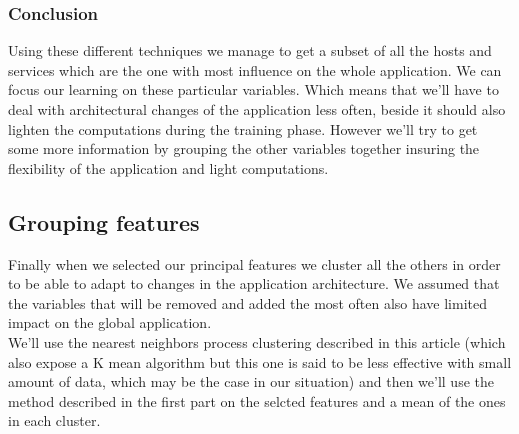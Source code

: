 \documentclass[10pt,a4paper,oneside]{article}
\begin{document}
\begin{multicols}{2}
\subsubsection{Conclusion}
Using these different techniques we manage to get a subset of all the hosts and services which are the one with most influence on the whole application. We can focus our learning on these particular variables. Which means that we'll have to deal with architectural changes of the application less often, beside it should also lighten the computations during the training phase. However we'll try to get some more information by grouping the other variables together insuring the flexibility of the application and light computations.\\
\subsection{Grouping features}
Finally when we selected our principal features we cluster all the others in order to be able to adapt to changes in the application architecture. We assumed that the variables that will be removed and added the most often also have limited impact on the global application.\\
We'll use the nearest neighbors process clustering described in this article \cite{NNCluster} (which also expose a K mean algorithm but this one is said to be less effective with small amount of data, which may be the case in our situation) and then we'll use the method described in the first part on the selcted features and a mean of the ones in each cluster.

\end{multicols}

\vspace{0.8cm}
\end{document}
